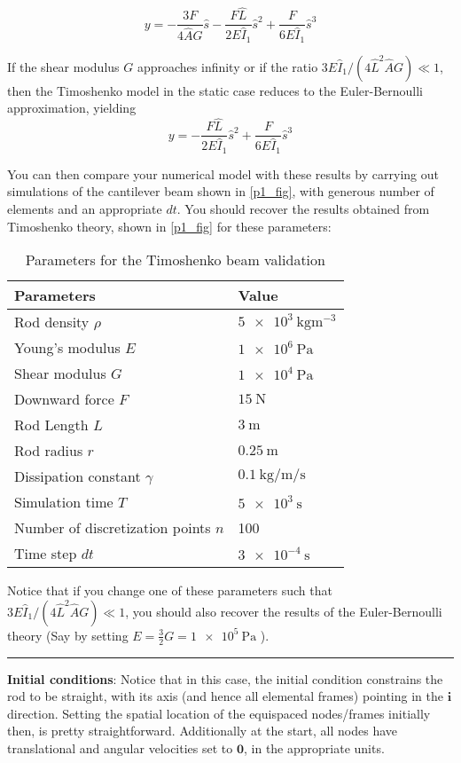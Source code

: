\documentclass[11pt]{article}
\begin{document}
\[ y=-\frac{3F}{4\hat{A}G}\hat{s} -
	\frac{F\hat{L}}{2E\hat{I}_1}\hat{s}^2 + \frac{F}{6E\hat{I}_1}\hat{s}^3 \]

If the shear modulus \(G\) approaches infinity or if the ratio
\(3E\hat{I}_1/(4\hat{L}^2\hat{A}G)\ll 1\), then the Timoshenko model in the
static case reduces to the Euler-Bernoulli approximation, yielding
\[ y= - \frac{F\hat{L}}{2E\hat{I}_1}\hat{s}^2 +
	\frac{F}{6E\hat{I}_1}\hat{s}^3 \]

You can then compare your numerical model with these results by carrying out
simulations of the cantilever beam shown in \cref{p1_fig}, with generous number
of elements and an appropriate \(dt\). You should recover the results
obtained from Timoshenko theory, shown in \cref{p1_fig} for these parameters:

\begin{table}[htbp]
\caption{\label{timoshenko_params}
Parameters for the Timoshenko beam validation}
\centering
\begin{tabular}{ll}
\toprule
Parameters & Value\\
\midrule
Rod density \(\rho\) & \(\SI{5e3}{\kg \m^{-3}}\)\\
Young's modulus \(E\) & \(\SI{1e6}{\Pa}\)\\
Shear modulus \(G\) & \(\SI{1e4}{\Pa}\)\\
Downward force \(F\) & \(\SI{15}{\N}\)\\
Rod Length \(L\) & \(\SI{3}{\m}\)\\
Rod radius \(r\) & \(\SI{0.25}{\m}\)\\
Dissipation constant \(\gamma\) & \(\SI{0.1}{\kg\per\m\per\second}\)\\
Simulation time \(T\) & \(\SI{5e3}{\second}\)\\
Number of discretization points \(n\) & 100\\
Time step \(dt\) & \(\SI{3e-4}{\second}\)\\
\bottomrule
\end{tabular}
\end{table}

Notice that if you change one of these parameters such that \(3E\hat{I}_1/(4\hat{L}^2\hat{A}G)\ll 1\), you should also recover the
results of the Euler-Bernoulli theory (Say by setting \(E = \frac{3}{2}G = \SI{1e5}{\Pa}\) ).

\noindent\rule{1\textwidth}{0.01pt}
\textbf{Initial conditions}: Notice that in this case, the initial
condition constrains the rod to be straight, with its axis (and hence all
elemental frames) pointing in the \(\mathbf{i}\) direction. Setting the spatial location
of the equispaced nodes/frames initially then, is pretty straightforward. Additionally at the
start, all nodes have translational and angular velocities set to \(\mathbf{0}\), in the
appropriate units.
\end{document}

